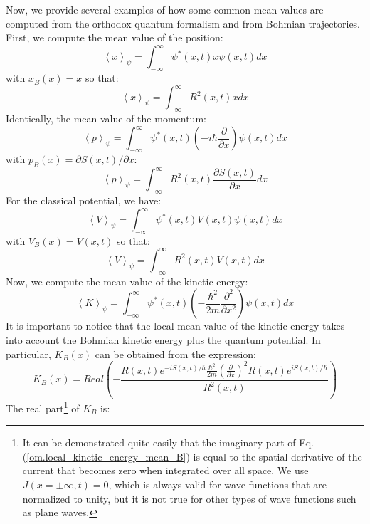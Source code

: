 \documentclass[onecolumn,nofootinbib, secnumarabic, amsmath, nobibnotes,12pt,aps,pra]{revtex4-1}
\newcommand{\eref}[1]{Eq. (\ref{#1})}
\newcommand{\avg}[1]{\left\langle #1 \right\rangle} %
\begin{document}
Now, we provide several examples of how some common mean values are
computed from the orthodox quantum formalism and from Bohmian
trajectories. First, we compute the mean value of the position:
\begin{equation}
\label{om.position_mean_0}
\avg{x}_{\psi} = \int_{-\infty}^{\infty} \psi^{*}(x,t) x \psi(x,t) dx
\end{equation}
with $x_B(x) = x$ so that:
\begin{equation}
\label{om.position_mean_B}
\avg{x}_{\psi} = \int_{-\infty}^{\infty} R^2(x,t) x dx
\end{equation}
Identically, the mean value of the momentum:
\begin{equation}
\label{om.momentum_mean_0}
\avg{p}_{\psi} = \int_{-\infty}^{\infty} \psi^{*}(x,t) \left(-i\hbar \frac {\partial} {\partial x}\right) \psi(x,t) dx
\end{equation}
with $p_B(x) = {\partial S(x,t)}/{\partial x}$:
\begin{equation}
\label{om.momentum_mean_B}
\avg{p}_{\psi} = \int_{-\infty}^{\infty} R^2(x,t) \frac {\partial S(x,t)} {\partial x} dx
\end{equation}
For the classical potential, we have:
\begin{equation}
\label{om.Potential_energy_mean_0}
\avg{V}_{\psi} = \int_{-\infty}^{\infty} \psi^{*}(x,t) V(x,t) \psi(x,t) dx
\end{equation}
with $V_B(x) = V(x,t)$ so that:
\begin{equation}
\label{om.Potential_energy_mean_B}
\avg{V}_{\psi} = \int_{-\infty}^{\infty} R^2(x,t) V(x,t) dx
\end{equation}
Now, we compute the mean value of the kinetic energy:
\begin{equation}
\label{om.kinetic_energy_mean_0}
\avg{K}_{\psi} = \int_{-\infty}^{\infty} \psi^{*}(x,t) \left(-\frac {\hbar^2} {2m} \frac {\partial^2} {\partial x^2}\right) \psi(x,t) dx
\end{equation}
It is important to notice that the local mean value of the kinetic
energy takes into account the Bohmian kinetic energy plus the
quantum potential. In particular, $K_B(x)$ can be obtained from the
expression:
\begin{equation}
\label{om.local_kinetic_energy_mean_B}
K_B(x) = Real \left( -\frac {R(x,t) e^{-iS(x,t)/\hbar} \frac{\hbar^2} {2m} \left( \frac {\partial} {\partial x} \right)^2 R(x,t) e^{iS(x,t)/\hbar}} {R^2(x,t)} \right)
\end{equation}
The real part\footnote{It can be demonstrated quite easily that the imaginary part of \eref{om.local_kinetic_energy_mean_B} is equal to the spatial derivative of the current that becomes zero when integrated over all space. We use $J(x = \pm\infty,t) = 0$, which is always valid for wave functions that are normalized to unity, but it is not true for other types of wave functions such as plane waves.} of $K_B$ is:
\end{document}
